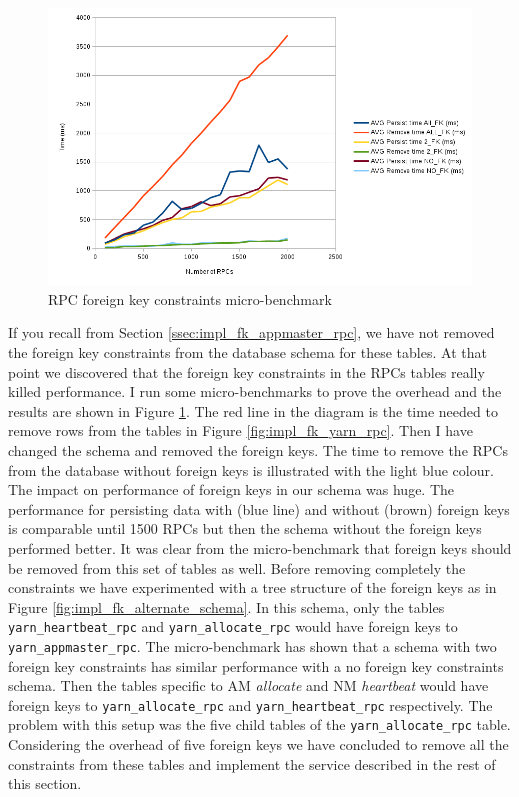\begin{figure}
\centering
\includegraphics[scale=0.7]{resources/images/Implementation/rpc_fk_overhead.png}
\caption{RPC foreign key constraints micro-benchmark}
\label{fig:impl_fk_overhead}
\end{figure}

If you recall from Section \ref{ssec:impl_fk_appmaster_rpc}, we have
not removed the foreign key constraints from the database schema for
these tables. At that point we discovered that the foreign
key constraints in the RPCs tables really killed performance. I run
some micro-benchmarks to prove the overhead and the results are shown in
Figure \ref{fig:impl_fk_overhead}. The red line in the diagram is the
time needed to remove rows from the tables in Figure
\ref{fig:impl_fk_yarn_rpc}. Then I have changed the schema and removed
the foreign keys. The time to remove the RPCs from the database
without foreign keys is illustrated with the light blue colour. The impact
on performance of foreign keys in our schema was huge. The performance
for persisting data with (blue line) and without (brown) foreign keys
is comparable until 1500 RPCs but then the schema without the foreign
keys performed better. It was clear from the micro-benchmark that
foreign keys should be removed from this set of tables as well. Before
removing completely the constraints we have experimented with a tree
structure of the foreign keys as in Figure
\ref{fig:impl_fk_alternate_schema}. In this schema, only the tables
\texttt{yarn\_heartbeat\_rpc} and \texttt{yarn\_allocate\_rpc} would
have foreign keys to \texttt{yarn\_appmaster\_rpc}. The
micro-benchmark has shown that a schema with two foreign key
constraints has similar performance with a no foreign key constraints
schema. Then the tables specific to AM \emph{allocate} and NM
\emph{heartbeat} would have foreign keys to
\texttt{yarn\_allocate\_rpc} and \texttt{yarn\_heartbeat\_rpc}
respectively. The problem with this setup was the five child tables
of the \texttt{yarn\_allocate\_rpc} table. Considering the overhead of
five foreign keys we have concluded
to remove all the constraints from these tables and implement the
service described in the rest of this section.


